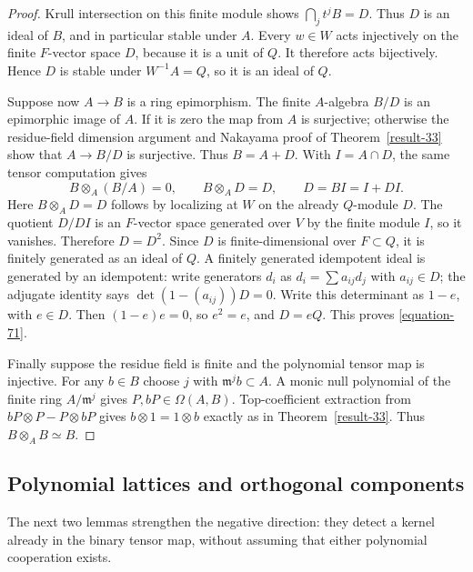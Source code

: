 \documentclass[11pt,a4paper]{article}
\theoremstyle{definition}
\begin{document}
\begin{proof}
Krull intersection on this finite module shows
$\bigcap_j t^j B=D$. Thus $D$ is an ideal of
$B$, and in particular stable under $A$.
Every $w\in W$ acts injectively on the finite
$F$-vector space $D$, because it is a unit of $Q$.
It therefore acts bijectively. Hence $D$ is stable
under $W^{-1}A=Q$, so it is an ideal of $Q$.

Suppose now $A\to B$ is a ring epimorphism.
The finite $A$-algebra $B/D$ is an epimorphic image
of $A$. If it is zero the map from $A$ is surjective;
otherwise the residue-field dimension argument
and Nakayama proof of Theorem~\ref{result-33} show that $A\to B/D$
is surjective. Thus $B=A+D$. With $I=A\cap D$,
the same tensor computation gives
\[
 B\otimes_A(B/A)=0,\qquad B\otimes_A D=D,\qquad
                         D=BI=I+DI.
\]
Here $B\otimes_A D=D$ follows by localizing at
$W$ on the already $Q$-module $D$.
The quotient $D/DI$ is an $F$-vector space generated
over $V$ by the finite module $I$, so it vanishes.
Therefore $D=D^2$.
Since $D$ is finite-dimensional over $F\subset Q$,
it is finitely generated as an ideal of $Q$.
A finitely generated idempotent ideal is generated
by an idempotent: write generators $d_i$ as
$d_i=\sum a_{ij}d_j$ with $a_{ij}\in D$;
the adjugate identity says $\det(1-(a_{ij}))D=0$.
Write this determinant as $1-e$, with $e\in D$.
Then $(1-e)e=0$, so $e^2=e$, and $D=eQ$.
This proves \eqref{equation-71}.

Finally suppose the residue field is finite and
the polynomial tensor map is injective. For any
$b\in B$ choose $j$ with $\mathfrak m^j b\subset A$.
A monic null polynomial of the finite ring
$A/\mathfrak m^j$ gives $P,bP\in\Omega(A,B)$.
Top-coefficient extraction from
$bP\otimes P-P\otimes bP$ gives
$b\otimes1=1\otimes b$ exactly as in Theorem~\ref{result-33}.
Thus $B\otimes_A B\simeq B$.
\end{proof}

\subsection{Polynomial lattices and orthogonal components}
The next two lemmas strengthen the negative direction: they detect a
kernel already in the binary tensor map, without assuming that either
polynomial cooperation exists.
\end{document}
